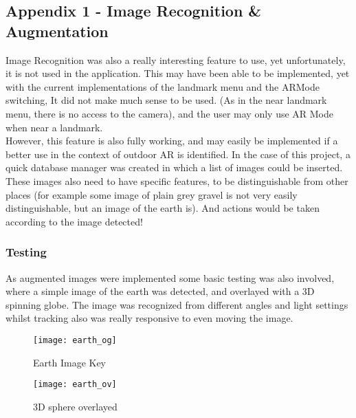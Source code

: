  \subsection*{Appendix 1 - Image Recognition \& Augmentation}
 Image Recognition was also a really interesting feature to use, yet unfortunately, it is not used in the application. This may have been able to be implemented, yet with the current implementations 
 of the landmark menu and the ARMode switching, It did not make much sense to be used. (As in the near landmark menu, there is no access to the camera), and the user may only use AR Mode when near a landmark.\\
 However, this feature is also fully working, and may easily be implemented if a better use in the context of outdoor AR is identified. 
 In the case of this project, a quick database manager was created in which a list of images could
  be inserted. These images also need to have specific features, to be distinguishable from other places (for example some image of plain grey gravel is not very easily distinguishable, 
  but an image of the earth is). And actions would be taken according to the image detected!
  \subsubsection*{Testing}
As augmented images were implemented some basic testing was also involved, where a simple image of the earth was detected, and overlayed with a 3D spinning globe. 
The image was recognized from different angles and light settings whilst tracking also was really responsive to even moving the image.
\begin{figure}[!htb]
        \texttt{[image: earth\_og]}
            \caption{Earth Image Key}
            \label{fig:earth_og}
    \endminipage\hfill
        \texttt{[image: earth\_ov]}
        \caption{3D sphere overlayed}
        \label{fig:earth_ov}
    \endminipage
    \end{figure}

